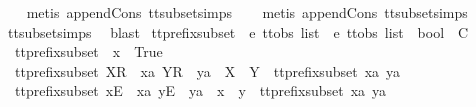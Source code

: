 \ \ \isamarkupfalse%
\ {\isacharparenleft}metis\ append{\isacharunderscore}Cons\ tt{\isacharunderscore}subset{\isachardot}simps{\isacharparenleft}{}{\isacharparenright}{\isacharparenright}\isanewline
\ \ \isamarkupfalse%
\ {\isacharparenleft}metis\ append{\isacharunderscore}Cons\ tt{\isacharunderscore}subset{\isachardot}simps{\isacharparenleft}{}{\isacharparenright}{\isacharparenright}\isanewline
\ \ \isamarkupfalse%
\ tt{\isacharunderscore}subset{\isachardot}simps{\isacharparenleft}{}{\isacharparenright}\ \isamarkupfalse%
\ blast{\isacharplus}%
\endisatagproof
{\isafoldproof}%
%
\isadelimproof
%
\endisadelimproof
%
\isadelimdocument
%
\endisadelimdocument
%
\isatagdocument
%
\isamarkuptrue%
%
\endisatagdocument
{\isafolddocument}%
%
\isadelimdocument
%
\endisadelimdocument
{}\isamarkupfalse%
\ tt{\isacharunderscore}prefix{\isacharunderscore}subset\ {\isacharcolon}{\isacharcolon}\ {\isachardoublequoteopen}{\isacharprime}e\ ttobs\ list\ {\isasymRightarrow}\ {\isacharprime}e\ ttobs\ list\ {\isasymRightarrow}\ bool{\isachardoublequoteclose}\ {\isacharparenleft}\ {\isachardoublequoteopen}{\isasymlesssim}\isactrlsub C{\isachardoublequoteclose}\ {}{}{\isacharparenright}\ \isanewline
\ \ {\isachardoublequoteopen}tt{\isacharunderscore}prefix{\isacharunderscore}subset\ {\isacharbrackleft}{\isacharbrackright}\ x\ {\isacharequal}\ True{\isachardoublequoteclose}\ {\isacharbar}\isanewline
\ \ {\isachardoublequoteopen}tt{\isacharunderscore}prefix{\isacharunderscore}subset\ {\isacharparenleft}{\isacharbrackleft}X{\isacharbrackright}\isactrlsub R\ {\isacharhash}\ xa{\isacharparenright}\ {\isacharparenleft}{\isacharbrackleft}Y{\isacharbrackright}\isactrlsub R\ {\isacharhash}\ ya{\isacharparenright}\ {\isacharequal}\ {\isacharparenleft}X\ {\isasymsubseteq}\ Y\ {\isasymand}\ tt{\isacharunderscore}prefix{\isacharunderscore}subset\ xa\ ya{\isacharparenright}{\isachardoublequoteclose}\ {\isacharbar}\isanewline
\ \ {\isachardoublequoteopen}tt{\isacharunderscore}prefix{\isacharunderscore}subset\ {\isacharparenleft}{\isacharbrackleft}x{\isacharbrackright}\isactrlsub E\ {\isacharhash}\ xa{\isacharparenright}\ {\isacharparenleft}{\isacharbrackleft}y{\isacharbrackright}\isactrlsub E\ {\isacharhash}\ ya{\isacharparenright}\ {\isacharequal}\ {\isacharparenleft}x\ {\isacharequal}\ y\ {\isasymand}\ tt{\isacharunderscore}prefix{\isacharunderscore}subset\ xa\ ya{\isacharparenright}{\isachardoublequoteclose}\ {\isacharbar}\isanewline
